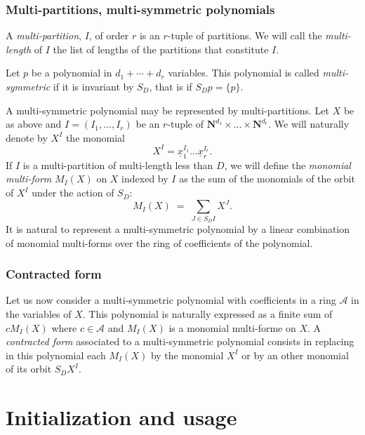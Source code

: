 \documentclass[11pt]{article}
\begin{document}
\subsubsection{Multi-partitions, multi-symmetric polynomials}

A \textit{multi-partition}, $I$, of order $r$ is an $r$-tuple of partitions.  We
will call the \textit{multi-length} of $I$ the list of lengths of the partitions
that constitute $I$.

Let $p$ be a polynomial in $d_1+\cdots + d_r$ variables. This polynomial is
called \textit{multi-symmetric} if it is invariant by $S_D$, that is if $S_D p =
\{p\}$.

A multi-symmetric polynomial may be represented by multi-partitions.  Let $X$ be
as above and $I=(I_1,\ldots,I_r)$ be an $r$-tuple of $\mathbf{N}^{d_1}\times
\ldots \times \mathbf{N}^{d_r}$.  We will naturally denote by $X^I$ the monomial
\begin{equation*}
  X^I = {\underline x}_1^{I_1}\ldots{\underline x}_r^{I_r}.
\end{equation*}
If $I$ is a multi-partition of multi-length less than $D$, we will define the
\textit{monomial multi-form} $M_I(X)$ on $X$ indexed by $I$ as the sum of the
monomials of the orbit of $X^I$ under the action of $S_D$:
\begin{equation*}
  M_I(X) \;=\; \sum_{J \in S_DI} X^J.
\end{equation*}
It is natural to represent a multi-symmetric polynomial by a linear combination
of monomial multi-forms over the ring of coefficients of the polynomial.


\subsubsection{Contracted form}

Let us now consider a multi-symmetric polynomial with coefficients in a ring
$\mathcal{A}$ in the variables of $X$.  This polynomial is naturally expressed
as a finite sum of $cM_I(X)$ where $c \in \mathcal{A}$ and $M_I(X)$ is a
monomial multi-forme on $X$. A \textit{contracted form} associated to a
multi-symmetric polynomial consists in replacing in this polynomial each
$M_I(X)$ by the monomial $X^I$ or by an other monomial of its orbit $S_DX^I$.



\section{Initialization and usage}
\end{document}
